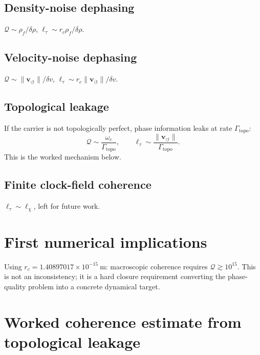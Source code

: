 \documentclass[11pt]{article}
\newcommand{\vnorm}{\lVert \mathbf{v}_{\!\boldsymbol{\circlearrowleft}}\rVert}
\newcommand{\rhoF}{\rho_{\!f}}
\newcommand{\rc}{r_c}
\begin{document}
\subsection{Density-noise dephasing} $\mathcal{Q} \sim \rhoF/\delta\rho$, \quad $\ell_\tau \sim \rc\rhoF/\delta\rho$.

\subsection{Velocity-noise dephasing} $\mathcal{Q} \sim \vnorm/\delta v$, \quad $\ell_\tau \sim \rc\vnorm/\delta v$.

\subsection{Topological leakage}
If the carrier is not topologically perfect, phase information leaks at rate $\Gamma_{\mathrm{topo}}$:
\begin{equation}
    \mathcal{Q} \sim \frac{\omega_c}{\Gamma_{\mathrm{topo}}}, \qquad
    \ell_\tau \sim \frac{\vnorm}{\Gamma_{\mathrm{topo}}}.
    \label{eq:Q_topo}
\end{equation}
This is the worked mechanism below.

\subsection{Finite clock-field coherence} $\ell_\tau \sim \ell_\chi$, left for future work.

\section{First numerical implications}

Using $\rc = 1.40897017\times 10^{-15}~\mathrm{m}$: macroscopic coherence requires $\mathcal{Q} \gtrsim 10^{15}$. This is not an inconsistency; it is a hard closure requirement converting the phase-quality problem into a concrete dynamical target.

\section{Worked coherence estimate from topological leakage}
\end{document}
